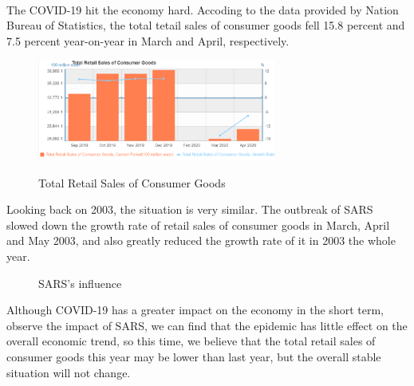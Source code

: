 \documentclass[]{article}
\begin{document}
\paragraph{}
The COVID-19 hit the economy hard. Accoding to the data provided by Nation Bureau of Statistics, the total tetail sales of consumer goods fell 15.8 percent and 7.5 percent year-on-year in March and April, respectively. 
\begin{figure}[H]
	\centering
	\includegraphics[width=0.7\textwidth]{Eco_2020.png}
	\caption{Total Retail Sales of Consumer Goods}
	\cite{nbsdata}
\end{figure}
\par
Looking back on 2003, the situation is very similar. The outbreak of SARS slowed down the growth rate of retail sales of consumer goods in March, April and May 2003,  and also greatly reduced the growth rate of it in 2003 the whole year.
\begin{figure}[H]
    \centering
	\caption{SARS's influence}
	\cite{nbsdata}
\end{figure}
\par
Although COVID-19 has a greater impact on the economy in the short term, observe the impact of SARS, we can find that the epidemic has little effect on the overall economic trend, so this time, we believe that the total retail sales of consumer goods this year may be lower than last year, but the overall stable situation will not change.



\end{document}

